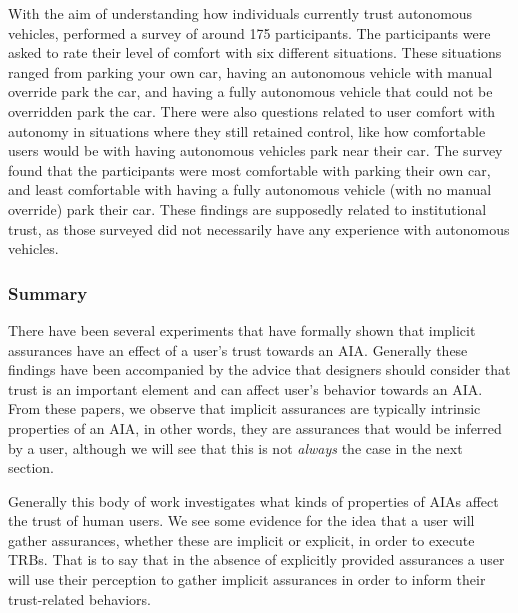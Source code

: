 With the aim of understanding how individuals currently trust autonomous vehicles, \citet{Munjal_Desai2009-en} performed a survey of around 175 participants. The participants were asked to rate their level of comfort with six different situations. These situations ranged from parking your own car, having an autonomous vehicle with manual override park the car, and having a fully autonomous vehicle that could not be overridden park the car. There were also questions related to user comfort with autonomy in situations where they still retained control, like how comfortable users would be with having autonomous vehicles park near their car. The survey found that the participants were most comfortable with parking their own car, and least comfortable with having a fully autonomous vehicle (with no manual override) park their car. These findings are supposedly related to institutional trust, as those surveyed did not necessarily have any experience with autonomous vehicles.

\subsubsection{Summary}
There have been several experiments that have formally shown that implicit assurances have an effect of a user's trust towards an AIA. Generally these findings have been accompanied by the advice that designers should consider that trust is an important element and can affect user's behavior towards an AIA. From these papers, we observe that implicit assurances are typically intrinsic properties of an AIA, in other words, they are assurances that would be inferred by a user, although we will see that this is not \emph{always} the case in the next section. 

Generally this body of work investigates what kinds of properties of AIAs affect the trust of human users. We see some evidence for the idea that a user will gather assurances, whether these are implicit or explicit, in order to execute TRBs. That is to say that in the absence of explicitly provided assurances a user will use their perception to gather implicit assurances in order to inform their trust-related behaviors.

